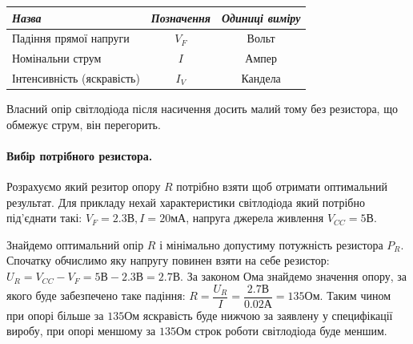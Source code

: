 \documentclass[12pt,a4paper]{report}  %
\begin{document}
\begin{figure}[h!]
\label{ris:image}
\end{figure}



\begin{center}
\begin{tabular}{|l|c|c|}
\hline
\textit{Назва} & \textit{Позначення} & \textit{Одиниці виміру} \\
\hline
Падіння прямої напруги & $V_F$ & Вольт \\
\hline		
Номінальни струм & $I$ & Ампер \\
\hline
Інтенсивність (яскравість) & $I_V$ & Кандела \\
\hline
\end{tabular}
\end{center}

Власний опір світлодіода після насичення досить малий тому без резистора, що обмежує струм, він перегорить.

\paragraph{Вибір потрібного резистора.}

Розрахуємо який резитор опору $R$ потрібно взяти щоб отримати оптимальний результат. Для прикладу нехай характеристики світлодіода який потрібно під'єднати такі: $V_F = 2.3\text{В}, I = 20\text{мА}$, напруга джерела живлення $V_{CC} = 5\text{В}$.

Знайдемо оптимальний опір $R$ і мінімально допустиму потужність резистора $P_R$.
Спочатку обчислимо яку напругу повинен взяти на себе резистор:
$U_R = V_{CC} - V_F = 5 \text{В} - 2.3\text{В} = 2.7\text{В}$.
За законом Ома знайдемо значення опору, за якого буде забезпечено таке падіння:
$R = \dfrac{U_R}{I} = \dfrac{2.7 \text{В}}{0.02 \text{А}} = 135 \text{Ом}$.
Таким чином при опорі більше за $135\text{Ом}$ яскравість буде нижчою за заявлену у специфікації виробу, при опорі меншому за $135\text{Ом}$ строк роботи світлодіода буде меншим.
\end{document}

